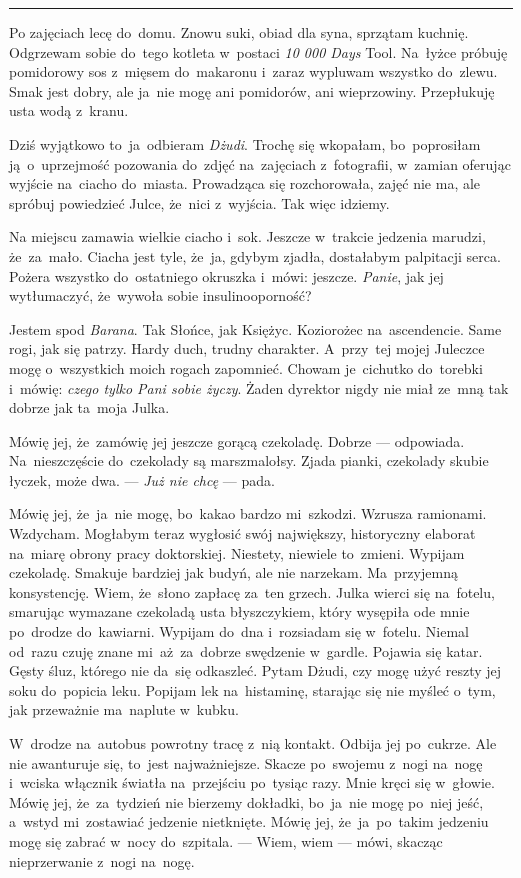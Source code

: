\documentclass[9pt, a5paper]{memoir}
\begin{document}
\fancybreak{* \quad * \quad *}

Po zajęciach lecę do~domu. Znowu suki, obiad dla syna, sprzątam kuchnię. Odgrzewam sobie do~tego kotleta w~postaci \textit{10 000 Days} Tool. Na~łyżce próbuję pomidorowy sos z~mięsem do~makaronu i~zaraz wypluwam wszystko do~zlewu. Smak jest dobry, ale ja~nie mogę ani pomidorów, ani wieprzowiny. Przepłukuję usta wodą z~kranu.

Dziś wyjątkowo to~ja~odbieram \textit{Dżudi}. Trochę się wkopałam, bo~poprosiłam ją~o~uprzejmość pozowania do~zdjęć na~zajęciach z~fotografii, w~zamian oferując wyjście na~ciacho do~miasta. Prowadząca się rozchorowała, zajęć nie ma, ale spróbuj powiedzieć Julce, że~nici z~wyjścia. Tak więc idziemy.

Na miejscu zamawia wielkie ciacho i~sok. Jeszcze w~trakcie jedzenia marudzi, że~za~mało. Ciacha jest tyle, że~ja, gdybym zjadła, dostałabym palpitacji serca. Pożera wszystko do~ostatniego okruszka i~mówi: jeszcze. \textit{Panie}, jak jej wytłumaczyć, że~wywoła sobie insulinooporność?

Jestem spod \textit{Barana}. Tak Słońce, jak Księżyc. Koziorożec na~ascendencie. Same rogi, jak się patrzy. Hardy duch, trudny charakter. A~przy~tej mojej Juleczce mogę o~wszystkich moich rogach zapomnieć. Chowam je~cichutko do~torebki i~mówię: \textit{czego tylko Pani sobie życzy}. Żaden dyrektor nigdy nie miał ze~mną tak dobrze jak ta~moja Julka.

Mówię jej, że~zamówię jej jeszcze gorącą czekoladę. Dobrze --- odpowiada. Na~nieszczęście do~czekolady są marszmalołsy. Zjada pianki, czekolady skubie łyczek, może dwa. --- \textit{Już nie chcę} --- pada.

Mówię jej, że~ja~nie mogę, bo~kakao bardzo mi~szkodzi. Wzrusza ramionami. Wzdycham. Mogłabym teraz wygłosić swój największy, historyczny elaborat na~miarę obrony pracy doktorskiej. Niestety, niewiele to~zmieni. Wypijam czekoladę. Smakuje bardziej jak budyń, ale nie narzekam. Ma~przyjemną konsystencję. Wiem, że~słono zapłacę za~ten grzech. Julka wierci się na~fotelu, smarując wymazane czekoladą usta błyszczykiem, który wysępiła ode mnie po~drodze do~kawiarni. Wypijam do~dna i~rozsiadam się w~fotelu. Niemal od~razu czuję znane mi~aż~za~dobrze swędzenie w~gardle. Pojawia się katar. Gęsty śluz, którego nie da~się odkaszleć. Pytam Dżudi, czy mogę użyć reszty jej soku do~popicia leku. Popijam lek na~histaminę, starając się nie myśleć o~tym, jak przeważnie ma~naplute w~kubku.

W~drodze na~autobus powrotny tracę z~nią kontakt. Odbija jej po~cukrze. Ale nie awanturuje się, to~jest najważniejsze. Skacze po~swojemu z~nogi na~nogę i~wciska włącznik światła na~przejściu po~tysiąc razy. Mnie kręci się w~głowie. Mówię jej, że~za~tydzień nie bierzemy dokładki, bo~ja~nie mogę po~niej jeść, a~wstyd mi~zostawiać jedzenie nietknięte. Mówię jej, że~ja~po~takim jedzeniu mogę się zabrać w~nocy do~szpitala. --- Wiem, wiem --- mówi, skacząc nieprzerwanie z~nogi na~nogę.
\end{document}
